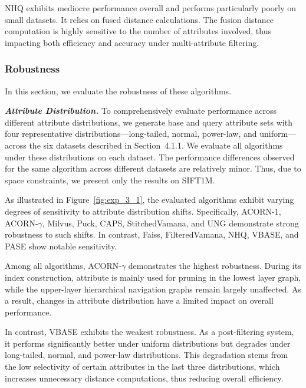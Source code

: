\documentclass[sigconf, nonacm]{acmart}
\begin{document}
\begin{sloppypar}
NHQ exhibits mediocre performance overall and performs particularly poorly on small datasets. It relies on fused distance calculations. The fusion distance computation is highly sensitive to the number of attributes involved, thus impacting both efficiency and accuracy under multi-attribute filtering.




\subsubsection{Robustness}In this section, we evaluate the robustness of these algorithms.

\textit{\textbf{Attribute Distribution.}} To comprehensively evaluate performance across different attribute distributions, we generate base and query attribute sets with four representative distributions—long-tailed, normal, power-law, and uniform—across the six datasets described in Section~4.1.1. We evaluate all algorithms under these distributions on each dataset. The performance differences observed for the same algorithm across different datasets are relatively minor. Thus, due to space constraints, we present only the results on SIFT1M.

As illustrated in Figure~\ref{fig:exp_3_1}, the evaluated algorithms exhibit varying degrees of sensitivity to attribute distribution shifts. Specifically, ACORN-1, ACORN-$\gamma$, Milvus, Puck, CAPS, StitchedVamana, and UNG demonstrate strong robustness to such shifts. In contrast, Faiss, FilteredVamana, NHQ, VBASE, and PASE show notable sensitivity.

Among all algorithms, ACORN-\(\gamma\) demonstrates the highest robustness. During its index construction, attribute is mainly used for pruning in the lowest layer graph, while the upper-layer hierarchical navigation graphs remain largely unaffected. As a result, changes in attribute distribution have a limited impact on overall performance.

In contrast, VBASE exhibits the weakest robustness. As a post-filtering system, it performs significantly better under uniform distributions but degrades under long-tailed, normal, and power-law distributions. This degradation stems from the low selectivity of certain attributes in the last three distributions, which increases unnecessary distance computations, thus reducing overall efficiency.


\end{sloppypar}
\end{document}
